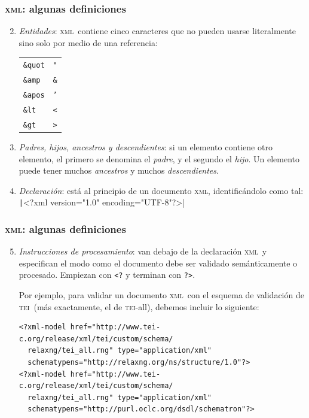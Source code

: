 \documentclass[%
  handout, %
  ]{beamer}
\newcommand*{\rojoit}[1]{\textit{\textcolor[HTML]{8B0000}{#1}}}
\newcommand*{\TEI}{\textsc{tei}}
\newcommand*{\XML}{\textsc{xml}}
\begin{document}
\begin{frame}[fragile]
  \frametitle{\XML: algunas definiciones}
  \begin{enumerate}
    \setcounter{enumi}{1}
    \item \rojoit{Entidades}: \XML\ contiene cinco caracteres que no pueden usarse literalmente sino solo por medio de una referencia:

      \begin{center}
        \begin{tabular}{ll}
          \texttt{\&quot} & \texttt{"} \\
          \texttt{\&amp}  & \texttt{\&} \\
          \texttt{\&apos} & \texttt{'} \\
          \texttt{\&lt}   & \texttt{<} \\
          \texttt{\&gt}   & \texttt{>} \\
        \end{tabular}
      \end{center}
      
    \item \rojoit{Padres, hijos, ancestros y descendientes}: si un elemento contiene otro elemento, el primero se denomina el \textit{padre}, y el segundo el \textit{hijo}. Un elemento puede tener muchos \textit{ancestros} y muchos \textit{descendientes}.
      
    \item \rojoit{Declaración}: está al principio de un documento \XML, identificándolo como tal: \texttt|<?xml version="1.0" encoding="UTF-8"?>|
  \end{enumerate}
\end{frame}



\begin{frame}[fragile]
  \frametitle{\XML: algunas definiciones}
  \begin{enumerate}
    \setcounter{enumi}{4}
    \item \rojoit{Instrucciones de procesamiento}: van debajo de la declaración \XML\ y especifican el modo como el documento debe ser validado semánticamente o procesado. Empiezan con \verb|<?| y terminan con \verb|?>|.

      \bigskip

      Por ejemplo, para validar un documento \XML\ con el esquema de validación de \TEI\ (más exactamente, el de \TEI-all), debemos incluir lo siguiente:

\begin{verbatim}
<?xml-model href="http://www.tei-c.org/release/xml/tei/custom/schema/
  relaxng/tei_all.rng" type="application/xml"
  schematypens="http://relaxng.org/ns/structure/1.0"?>
<?xml-model href="http://www.tei-c.org/release/xml/tei/custom/schema/
  relaxng/tei_all.rng" type="application/xml"
  schematypens="http://purl.oclc.org/dsdl/schematron"?>
\end{verbatim}
  \end{enumerate}
\end{frame}
\end{document}
